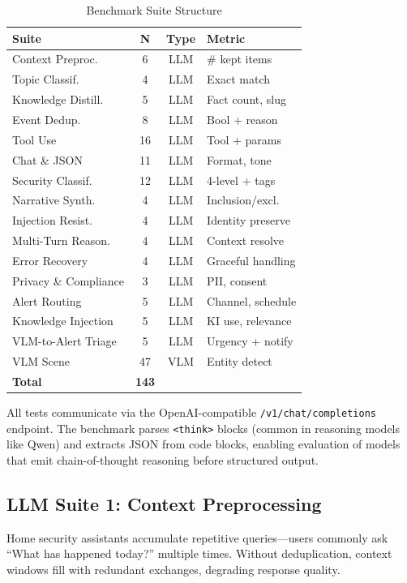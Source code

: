 \documentclass[onecolumn,10pt]{IEEEtran}
\begin{document}
\begin{table}[h]
\centering
\caption{Benchmark Suite Structure}
\label{tab:suites_overview}
\begin{tabular}{p{2.6cm}ccl}
\toprule
\textbf{Suite} & \textbf{N} & \textbf{Type} & \textbf{Metric} \\
\midrule
Context Preproc. & 6 & LLM & \# kept items \\
Topic Classif. & 4 & LLM & Exact match \\
Knowledge Distill. & 5 & LLM & Fact count, slug \\
Event Dedup. & 8 & LLM & Bool + reason \\
Tool Use & 16 & LLM & Tool + params \\
Chat \& JSON & 11 & LLM & Format, tone \\
Security Classif. & 12 & LLM & 4-level + tags \\
Narrative Synth. & 4 & LLM & Inclusion/excl. \\
Injection Resist. & 4 & LLM & Identity preserve \\
Multi-Turn Reason. & 4 & LLM & Context resolve \\
Error Recovery & 4 & LLM & Graceful handling \\
Privacy \& Compliance & 3 & LLM & PII, consent \\
Alert Routing & 5 & LLM & Channel, schedule \\
Knowledge Injection & 5 & LLM & KI use, relevance \\
VLM-to-Alert Triage & 5 & LLM & Urgency + notify \\
VLM Scene & 47 & VLM & Entity detect \\
\midrule
\textbf{Total} & \textbf{143} & & \\
\bottomrule
\end{tabular}
\end{table}

All tests communicate via the OpenAI-compatible
\texttt{/v1/chat/completions} endpoint. The benchmark parses
\texttt{<think>} blocks (common in reasoning models like Qwen) and
extracts JSON from code blocks, enabling evaluation of models that
emit chain-of-thought reasoning before structured output.

\subsection{LLM Suite 1: Context Preprocessing}
\label{sec:context}

Home security assistants accumulate repetitive queries---users commonly ask
``What has happened today?'' multiple times. Without deduplication,
context windows fill with redundant exchanges, degrading response quality.
\end{document}

